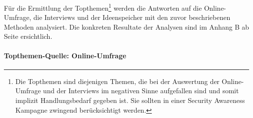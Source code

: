 \documentclass[../../main.tex]{subfiles}
\begin{document}
\begin{sloppypar}
Für die Ermittlung der Topthemen\footnote{Die Topthemen sind diejenigen Themen, die bei der Auswertung der Online-Umfrage und der Interviews im negativen Sinne aufgefallen sind und somit implizit Handlungsbedarf gegeben ist. Sie sollten in einer Security Awareness Kampagne zwingend berücksichtigt werden.} werden die Antworten auf die Online-Umfrage, die Interviews und der Ideenspeicher mit den zuvor beschriebenen Methoden analysiert. Die konkreten Resultate der Analysen sind im Anhang B ab Seite \pageref{Anhang B} ersichtlich.
\end{sloppypar}

\paragraph*{Topthemen-Quelle: Online-Umfrage}\mbox{}
\end{document}
